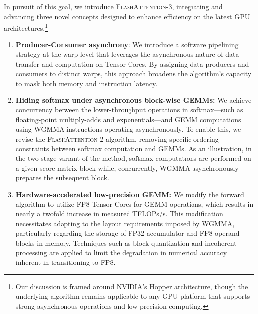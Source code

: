 In pursuit of this goal, we introduce \textsc{FlashAttention-3}, integrating and advancing three novel concepts designed to enhance efficiency on the latest GPU architectures.\footnote{Our discussion is framed around NVIDIA's Hopper architecture, though the underlying algorithm remains applicable to any GPU platform that supports strong asynchronous operations and low-precision computing.}

\begin{enumerate}

\item \textbf{Producer-Consumer asynchrony:} We introduce a software pipelining strategy at the warp level that leverages the asynchronous nature of data transfer and computation on Tensor Cores. By assigning data producers and consumers to distinct warps, this approach broadens the algorithm’s capacity to mask both memory and instruction latency.
\item \textbf{Hiding softmax under asynchronous block-wise GEMMs:} We achieve concurrency between the lower-throughput operations in softmax—such as floating-point multiply-adds and exponentials—and GEMM computations using WGMMA instructions operating asynchronously. To enable this, we revise the \textsc{FlashAttention-2} algorithm, removing specific ordering constraints between softmax computation and GEMMs. As an illustration, in the two-stage variant of the method, softmax computations are performed on a given score matrix block while, concurrently, WGMMA asynchronously prepares the subsequent block.
\item \textbf{Hardware-accelerated low-precision GEMM:} We modify the forward algorithm to utilize FP8 Tensor Cores for GEMM operations, which results in nearly a twofold increase in measured TFLOPs/s. This modification necessitates adapting to the layout requirements imposed by WGMMA, particularly regarding the storage of FP32 accumulator and FP8 operand blocks in memory. Techniques such as block quantization and incoherent processing are applied to limit the degradation in numerical accuracy inherent in transitioning to FP8.
\end{enumerate}

